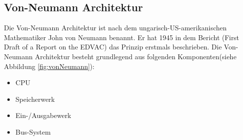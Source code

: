 \documentclass[12pt]{article}
\begin{document}
\subsection{Von-Neumann Architektur}
Die Von-Neumann Architektur ist nach dem ungarisch-US-amerikanischen Mathematiker John von Neumann benannt. Er hat 1945 in dem Bericht (First Draft of a Report on the EDVAC) das Prinzip erstmals beschrieben.
Die Von-Neumann Architektur besteht grundlegend aus folgenden Komponenten(siehe Abbildung \ref{fig:vonNeumann}):
\begin{itemize}
\item CPU 
\item Speicherwerk 
\item Ein-/Ausgabewerk
\item Bus-System
\end{itemize}
\end{document}
